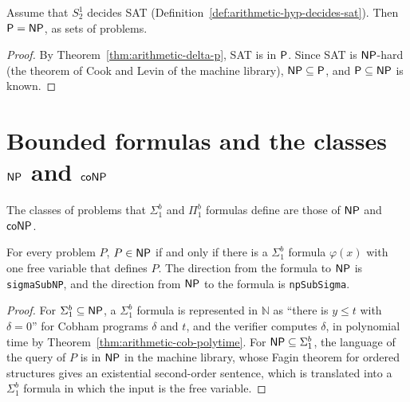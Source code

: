 \begin{theorem}[If $S^1_2$ decides SAT, then $\cP = \cNP$]
  \label{thm:arithmetic-decides-sat-pnp}
  \leanok
  Assume that $S^1_2$ decides SAT (Definition~\ref{def:arithmetic-hyp-decides-sat}). Then $\cP =
  \cNP$, as sets of problems.
\end{theorem}

\begin{proof}
  \leanok
  By Theorem~\ref{thm:arithmetic-delta-p}, SAT is in $\mathsf{P}$. Since SAT is $\mathsf{NP}$-hard (the theorem of
  Cook and Levin of the machine library), $\mathsf{NP} \subseteq \mathsf{P}$, and $\mathsf{P} \subseteq \mathsf{NP}$ is
  known.
\end{proof}

\section{Bounded formulas and the classes $\mathsf{NP}$ and $\mathsf{coNP}$}
\label{sec:arithmetic-sigma-np}

The classes of problems that $\Sigma^b_1$ and $\Pi^b_1$ formulas define are those of $\mathsf{NP}$ and
$\mathsf{coNP}$.

\begin{theorem}
  \label{thm:arithmetic-sigma-np}
  \leanok
  For every problem $P$, $P \in \mathsf{NP}$ if and only if there is a $\Sigma^b_1$ formula $\varphi(x)$ with
  one free variable that defines $P$. The direction from the formula to $\mathsf{NP}$ is
  \texttt{sigmaSubNP}, and the direction from $\mathsf{NP}$ to the formula is \texttt{npSubSigma}.
  \own{}
\end{theorem}

\begin{proof}
  \leanok
  For $\Sigma^b_1 \subseteq \mathsf{NP}$, a $\Sigma^b_1$ formula is represented in $\mathbb{N}$ as ``there is
  $y \le t$ with $\delta = 0$'' for Cobham programs $\delta$ and $t$, and the verifier computes
  $\delta$, in polynomial time by Theorem~\ref{thm:arithmetic-cob-polytime}. For $\mathsf{NP} \subseteq
  \Sigma^b_1$, the language of the query of $P$ is in $\mathsf{NP}$ in the machine library, whose Fagin
  theorem for ordered structures gives an existential second-order sentence, which is translated into
  a $\Sigma^b_1$ formula in which the input is the free variable.
\end{proof}

